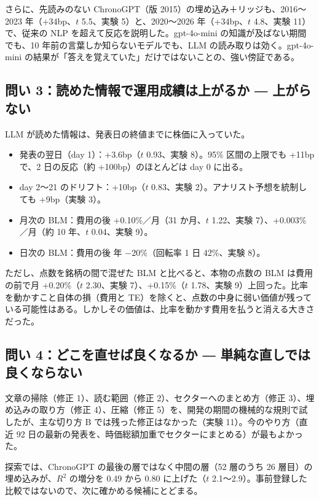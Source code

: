 さらに、先読みのない ChronoGPT（版 2015）の埋め込み＋リッジも、2016〜2023 年（+34bp、$t$ 5.5、実験 5）と、2020〜2026 年（+34bp、$t$ 4.8、実験 11）で、従来の NLP を超えて反応を説明した。gpt-4o-mini の知識が及ばない期間でも、10 年前の言葉しか知らないモデルでも、LLM の読み取りは効く。gpt-4o-mini の結果が「答えを覚えていた」だけではないことの、強い傍証である。

\subsection{問い 3：読めた情報で運用成績は上がるか ― 上がらない}

LLM が読めた情報は、発表日の終値までに株価に入っていた。

\begin{itemize}
\item 発表の翌日（day 1）：+3.6bp（$t$ 0.93、実験 8）。95\% 区間の上限でも +11bp で、2 日の反応（約 +100bp）のほとんどは day 0 に出る。
\item day 2〜21 のドリフト：+10bp（$t$ 0.83、実験 2）。アナリスト予想を統制しても +9bp（実験 3）。
\item 月次の BLM：費用の後 +0.10\%／月（31 か月、$t$ 1.22、実験 7）、+0.003\%／月（約 10 年、$t$ 0.04、実験 9）。
\item 日次の BLM：費用の後 年 $-20\%$（回転率 1 日 42\%、実験 8）。
\end{itemize}

ただし、点数を銘柄の間で混ぜた BLM と比べると、本物の点数の BLM は費用の前で月 +0.20\%（$t$ 2.30、実験 7）、+0.15\%（$t$ 1.78、実験 9）上回った。比率を動かすこと自体の損（費用と TE）を除くと、点数の中身に弱い価値が残っている可能性はある。しかしその価値は、比率を動かす費用を払うと消える大きさだった。

\subsection{問い 4：どこを直せば良くなるか ― 単純な直しでは良くならない}

文章の掃除（修正 1）、読む範囲（修正 2）、セクターへのまとめ方（修正 3）、埋め込みの取り方（修正 4）、圧縮（修正 5）を、開発の期間の機械的な規則で試したが、主な切り方 B では残った修正はなかった（実験 11）。今のやり方（直近 92 日の最新の発表を、時価総額加重でセクターにまとめる）が最もよかった。

探索では、ChronoGPT の最後の層ではなく中間の層（52 層のうち 26 層目）の埋め込みが、$R^2$ の増分を 0.49 から 0.80 に上げた（$t$ 2.1〜2.9）。事前登録した比較ではないので、次に確かめる候補にとどまる。

